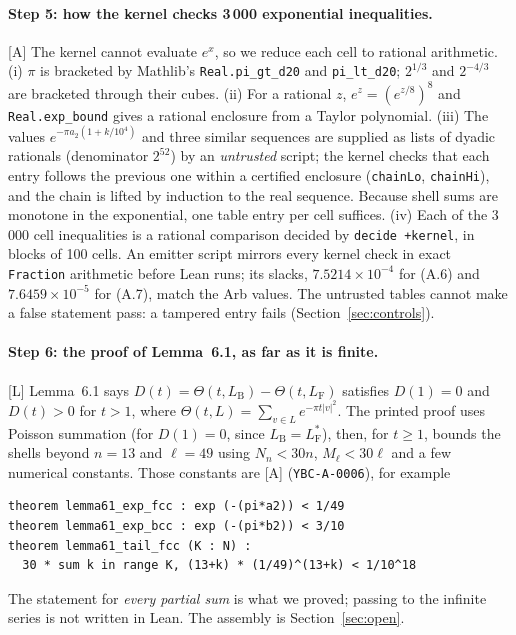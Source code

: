\documentclass[11pt]{article}
\newcommand{\tier}[1]{\textsf{[#1]}}
\newcommand{\tA}{\tier{A}}
\newcommand{\tL}{\tier{L}}
\newcommand{\lean}[1]{\texttt{#1}}
\newcommand{\LF}{L_{\mathrm F}}
\newcommand{\LB}{L_{\mathrm B}}
\begin{document}
\paragraph{Step 5: how the kernel checks 3\,000 exponential inequalities.}\tA{} The kernel cannot evaluate $e^x$, so we reduce each cell to rational arithmetic. (i) $\pi$ is
bracketed by Mathlib's \lean{Real.pi\_gt\_d20} and \lean{pi\_lt\_d20}; $2^{1/3}$ and $2^{-4/3}$ are bracketed through their cubes. (ii) For a rational $z$, $e^z=(e^{z/8})^8$ and
\lean{Real.exp\_bound} gives a rational enclosure from a Taylor polynomial. (iii) The values $e^{-\pi a_2(1+k/10^4)}$ and three similar sequences are supplied as lists of
dyadic rationals (denominator $2^{52}$) by an \emph{untrusted} script; the kernel checks that each entry follows the previous one within a certified enclosure
(\lean{chainLo}, \lean{chainHi}), and the chain is lifted by induction to the real sequence. Because shell sums are monotone in the exponential, one table entry per cell suffices. (iv) Each of the 3\,000 cell inequalities is a rational
comparison decided by \lean{decide +kernel}, in blocks of 100 cells. An emitter script mirrors every kernel check in exact \lean{Fraction} arithmetic before Lean runs; its slacks, $7.5214\times10^{-4}$ for (A.6) and $7.6459\times10^{-5}$ for (A.7), match the Arb values. The untrusted tables
cannot make a false statement pass: a tampered entry fails (Section~\ref{sec:controls}).

\paragraph{Step 6: the proof of Lemma~6.1, as far as it is finite.}\tL{} Lemma~6.1 says $D(t)=\Theta(t,\LB)-\Theta(t,\LF)$ satisfies $D(1)=0$ and $D(t)>0$ for $t>1$, where
$\Theta(t,L)=\sum_{v\in L}e^{-\pi t|v|^2}$. The printed proof uses Poisson summation (for $D(1)=0$, since $\LB=\LF^*$), then, for $t\ge1$, bounds the shells beyond $n=13$ and $\ell=49$ using $N_n<30n$, $M_\ell<30\ell$ and a few
numerical constants. Those constants are \tA{} (\texttt{YBC-A-0006}), for example
\begin{lstlisting}
theorem lemma61_exp_fcc : exp (-(pi*a2)) < 1/49
theorem lemma61_exp_bcc : exp (-(pi*b2)) < 3/10
theorem lemma61_tail_fcc (K : N) :
  30 * sum k in range K, (13+k) * (1/49)^(13+k) < 1/10^18
\end{lstlisting}
The statement for \emph{every partial sum} is what we proved; passing to the infinite series is not written in Lean. The assembly is Section~\ref{sec:open}.
\end{document}
